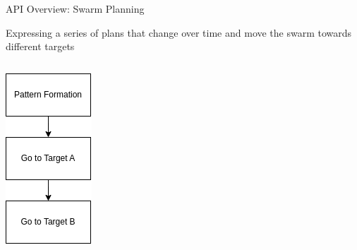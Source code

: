 \documentclass[presentation, 9pt]{beamer}\mode<presentation>{\usetheme{AMSBolognaFC}}
\begin{document}
\begin{frame}[fragile]{API Overview: Swarm Planning}

	Expressing a series of plans that change over time and
	move the swarm towards different targets
\vspace{0.4cm}
\begin{columns}
\begin{column}{0.2\textwidth}
\centering
\includegraphics[width=\textwidth]{img/swarm-planner.drawio.png}

\end{column}
\end{columns}
\end{frame}
\end{document}
